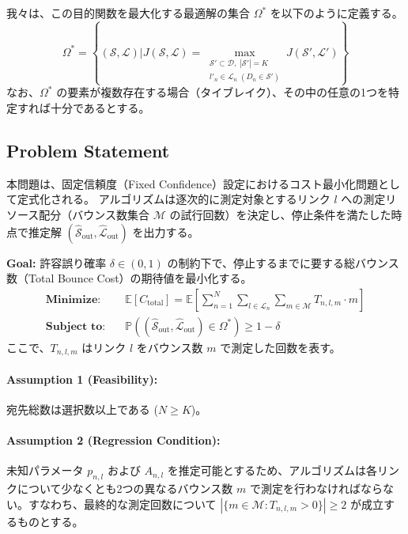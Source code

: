 \documentclass[conference]{IEEEtran}
\begin{document}
我々は、この目的関数を最大化する最適解の集合 $\Omega^*$ を以下のように定義する。
\begin{equation}
    \Omega^* = \left\{ (\mathcal{S}, \mathcal{L}) \mathrel{\Bigg|} J(\mathcal{S}, \mathcal{L}) = \max_{\substack{\mathcal{S}' \subset \mathcal{D},\; |\mathcal{S}'|=K \\ l'_n \in \mathcal{L}_n\; (D_n \in \mathcal{S}')}} J(\mathcal{S}', \mathcal{L}') \right\}
\end{equation}
なお、$\Omega^*$ の要素が複数存在する場合（タイブレイク）、その中の任意の1つを特定すれば十分であるとする。

\subsection{Problem Statement}
本問題は、固定信頼度（Fixed Confidence）設定におけるコスト最小化問題として定式化される。
アルゴリズムは逐次的に測定対象とするリンク $l$ への測定リソース配分（バウンス数集合 $\mathcal{M}$ の試行回数）を決定し、停止条件を満たした時点で推定解 $(\hat{\mathcal{S}}_{\mathrm{out}}, \hat{\mathcal{L}}_{\mathrm{out}})$ を出力する。

\textbf{Goal:}
許容誤り確率 $\delta \in (0, 1)$ の制約下で、停止するまでに要する総バウンス数（Total Bounce Cost）の期待値を最小化する。
\begin{align}
    \textbf{Minimize:} \quad & \mathbb{E}[C_{\mathrm{total}}] = \mathbb{E}\left[ \sum_{n=1}^{N} \sum_{l \in \mathcal{L}_n} \sum_{m \in \mathcal{M}} T_{n,l,m} \cdot m \right] \\
    \textbf{Subject to:} \quad & \mathbb{P}\left( (\hat{\mathcal{S}}_{\mathrm{out}}, \hat{\mathcal{L}}_{\mathrm{out}}) \in \Omega^* \right) \ge 1 - \delta
\end{align}
ここで、$T_{n,l,m}$ はリンク $l$ をバウンス数 $m$ で測定した回数を表す。

\paragraph{Assumption 1 (Feasibility):}
宛先総数は選択数以上である ($N \ge K$)。

\paragraph{Assumption 2 (Regression Condition):}
未知パラメータ $p_{n,l}$ および $A_{n,l}$ を推定可能とするため、アルゴリズムは各リンクについて少なくとも2つの異なるバウンス数 $m$ で測定を行わなければならない。すなわち、最終的な測定回数について $|\{m \in \mathcal{M} : T_{n,l,m} > 0\}| \ge 2$ が成立するものとする。
\end{document}
